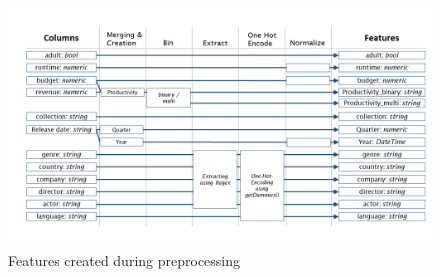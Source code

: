 \begin{figure}[htbp]
	\includegraphics[width=\textwidth]{images/3_features.png}
	\caption{Features created during preprocessing}
	\label{img:features}
\end{figure}
\FloatBarrier


